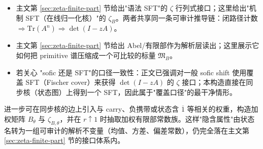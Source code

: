 \begin{remark}
\begin{itemize}
  \item 主文第 \ref{sec:zeta-finite-part} 节给出"语法 SFT"的 $\zeta$ 行列式接口；这里给出"机制 SFT（在线归一化核）"的 $\zeta_B$。两者共享同一条可审计推导链：闭路径计数 $\Rightarrow \mathrm{Tr}(A^n) \Rightarrow \det(I-zA)$。
  \item 主文第 \ref{sec:zeta-finite-part} 节给出 Abel/有限部作为解析层读出；这里展示它如何把 primitive 谱压缩成一个可比较的标量 $\mathfrak{M}_B$。
  \item 若关心 "sofic 还是 SFT"的口径一致性：正文已强调对一般 sofic shift 使用覆盖 SFT（Fischer cover）来获得 $\det(I-zA)$ 的 $\zeta$ 接口；本构造直接在同步核（状态图）上得到一个 SFT，因此属于"覆盖口径"的最干净情形。
\end{itemize}
\end{remark}

\begin{remark}
进一步可在同步核的边上引入与 carry、负携带或状态含 $\overline{1}$ 等相关的权重，构造加权矩阵 $B_\theta$ 与 $\zeta_{B,\theta}$，并在 $r\uparrow 1$ 时抽取加权有限部常数族。这样"隐含属性"由状态名转为一组可审计的解析不变量（均值、方差、偏差常数），仍完全落在主文第 \ref{sec:zeta-finite-part} 节的接口体系内。
\end{remark}
